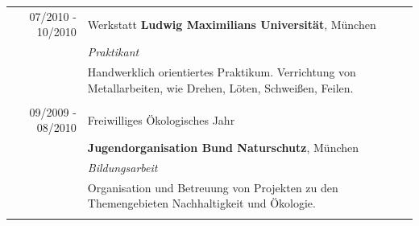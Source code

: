 \documentclass[a4paper,10pt]{article} %
\begin{document}
\begin{tabular}{r|p{11cm}}
 
\textsc{07/2010 - 10/2010} & Werkstatt \textbf{Ludwig Maximilians Universität}, München\\
                           & \emph{Praktikant}\\
                           & \small{Handwerklich orientiertes Praktikum. Verrichtung von Metallarbeiten, wie Drehen, Löten, Schweißen, Feilen. }\\
\multicolumn{2}{c}{} \\
 
 
\textsc{09/2009 - 08/2010} & Freiwilliges Ökologisches Jahr \\
                           & \textbf{Jugendorganisation Bund Naturschutz}, München\\
                           & \emph{Bildungsarbeit}\\
                           & \small{Organisation und Betreuung von Projekten zu den Themengebieten Nachhaltigkeit und Ökologie.}\\
\multicolumn{2}{c}{} \\
 
\end{tabular}
 
 
 
 
 
 
\end{document}

